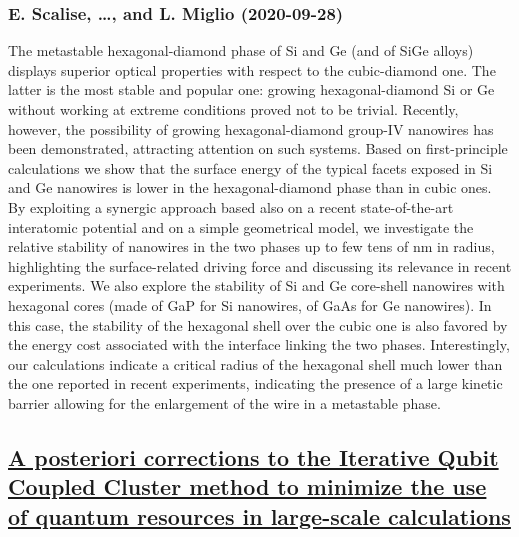 \subsubsection*{E. Scalise, \dots, and L. Miglio (2020-09-28)}
The metastable hexagonal-diamond phase of Si and Ge (and of SiGe alloys)
displays superior optical properties with respect to the cubic-diamond one. The
latter is the most stable and popular one: growing hexagonal-diamond Si or Ge
without working at extreme conditions proved not to be trivial. Recently,
however, the possibility of growing hexagonal-diamond group-IV nanowires has
been demonstrated, attracting attention on such systems. Based on
first-principle calculations we show that the surface energy of the typical
facets exposed in Si and Ge nanowires is lower in the hexagonal-diamond phase
than in cubic ones. By exploiting a synergic approach based also on a recent
state-of-the-art interatomic potential and on a simple geometrical model, we
investigate the relative stability of nanowires in the two phases up to few
tens of nm in radius, highlighting the surface-related driving force and
discussing its relevance in recent experiments. We also explore the stability
of Si and Ge core-shell nanowires with hexagonal cores (made of GaP for Si
nanowires, of GaAs for Ge nanowires). In this case, the stability of the
hexagonal shell over the cubic one is also favored by the energy cost
associated with the interface linking the two phases. Interestingly, our
calculations indicate a critical radius of the hexagonal shell much lower than
the one reported in recent experiments, indicating the presence of a large
kinetic barrier allowing for the enlargement of the wire in a metastable phase.

\subsection*{\href{http://arxiv.org/abs/2009.13622v1}{A posteriori corrections to the Iterative Qubit Coupled Cluster method  to minimize the use of quantum resources in large-scale calculations}}
